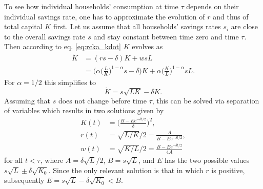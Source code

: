 To see how individual households' consumption at time $\tau$ depends on their individual savings rate, one has to approximate the evolution of $r$ and thus of total capital $K$ first. Let us assume that all households' savings rates $s_i$ are close to the overall savings rate $s$ and stay constant between time zero and time $\tau$. 
Then according to eq. \eqref{eq:rcka_kdot} $K$ evolves as 
\begin{equation}
    \begin{split}
    \dot K &= (r s - \delta) K + w s L \nonumber \\
    	   &= \Big(\alpha\Big(\frac{L}{K}\Big)^{1-\alpha} s - \delta\Big) K + \alpha \Big(\frac{K}{L}\Big)^{1-\alpha} s L.  
	\end{split}
\end{equation}
For $\alpha = 1/2$ this simplifies to 
\begin{equation}
    \label{aggKdotnew}
    \dot{K} = s\sqrt{L K} - \delta K.
\end{equation}
Assuming that $s$ does not change before time $\tau$, this can be solved via separation of variables which results in two solutions given by 
\begin{equation}
\begin{split}
    K(t) &= \Big(\frac{B - E e^{-\delta t/2}}{\delta} \Big)^2, \\
    r(t) &= \sqrt{L/K} / 2 = \frac{A}{B - E e^{-\delta t/2}}, \\
    w(t) &= \sqrt{K/L} / 2 = \frac{B - E e^{-\delta t/2}}{4 A}
\end{split}
\end{equation}
for all $t < \tau$,
where 
$A = \delta \sqrt{L} / 2$,
$B = s\sqrt{L}$,
and
$E$ has the two possible values $s\sqrt{L} \pm \delta \sqrt{K_0}$.
Since the only relevant solution is that in which $r$ is positive, subsequently $E = s\sqrt{L} - \delta \sqrt{K_0} < B$.

